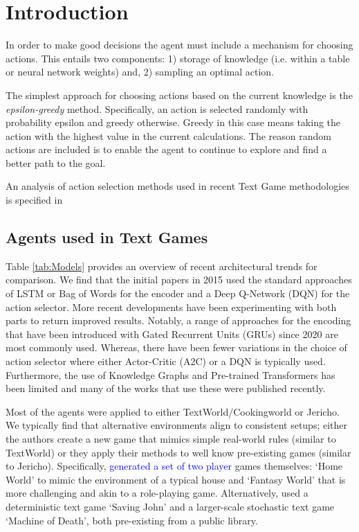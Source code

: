 \documentclass{article}
\title{}
\author{Philip Osborne}
\begin{document}
\maketitle
\section{Introduction}
\label{loc:introduction}
In order to make good decisions the agent must include a mechanism for choosing actions. This entails two components: 1) storage of knowledge (i.e. within a table or neural network weights) and, 2) sampling an optimal action.

The simplest approach for choosing actions based on the current knowledge is the \emph{epsilon-greedy} method. Specifically, an action is selected randomly with probability epsilon and greedy otherwise. Greedy in this case means taking the action with the highest value in the current calculations. The reason random actions are included is to enable the agent to continue to explore and find a better path to the goal.

An analysis of action selection methods used in recent Text Game methodologies is specified in 
\subsection{Agents used in Text Games}
\label{loc:text_game_agents.agents_used_in_text_games}
Table \ref{tab:Models} provides an overview of recent architectural trends for comparison. We find that the initial papers in 2015 used the standard approaches of LSTM or Bag of Words for the encoder and a Deep Q-Network (DQN) for the action selector. More recent developments have been experimenting with both parts to return improved results. Notably, a range of approaches for the encoding that have been introduced with Gated Recurrent Units (GRUs) since 2020 are most commonly used. Whereas, there have been fewer variations in the choice of action selector where either Actor-Critic (A2C) or a DQN is typically used. Furthermore, the use of Knowledge Graphs and Pre-trained Transformers has been limited and many of the works that use these were published recently.%

Most of the agents were applied to either TextWorld/Cookingworld or Jericho. We typically find that alternative environments align to consistent setups; either the authors create a new game that mimics simple real-world rules (similar to TextWorld) or they apply their methods to well know pre-existing games (similar to Jericho). Specifically, \cite{Narasimhan:2015} \textcolor{blue}{generated a set of two player} games themselves: `Home World' to mimic the environment of a typical house and `Fantasy World' that is more challenging and akin to a role-playing game. Alternatively, \cite{He:2015} used a deterministic text game `Saving John' and a larger-scale stochastic text game `Machine of Death', both pre-existing from a public library.
\end{document}
